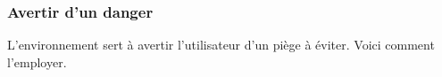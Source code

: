 \documentclass[12pt, a4paper]{article}
\begin{document}

\subsubsection{Avertir d'un danger}

L'environnement  sert à avertir l'utilisateur d'un piège à éviter. Voici comment l'employer.

\end{document}
